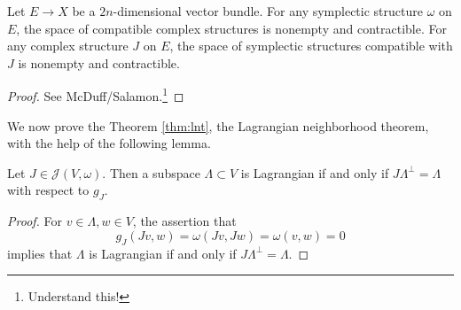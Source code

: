 \documentclass{amsart}
\begin{document}
\begin{theorem}
    Let $E\to X$ be a $2n$-dimensional vector bundle. For any symplectic structure
    $\omega$ on $E$, the space of compatible complex structures is nonempty and
    contractible. For any complex structure $J$ on $E$, the space of symplectic
    structures compatible with $J$ is nonempty and contractible.
    \label{thm:herm}
\end{theorem}
\begin{proof}
    See McDuff/Salamon.\footnote{Understand this!}
\end{proof}

We now prove the Theorem \ref{thm:lnt}, the Lagrangian neighborhood theorem, with the help
of the following lemma.

\begin{lemma}
    Let $J\in\mathcal{J}(V,\omega)$. Then a subspace $\Lambda\subset V$ is Lagrangian
    if and only if $J\Lambda^\perp=\Lambda$ with respect to $g_J$.
\end{lemma}
\begin{proof}
    For $v\in\Lambda,w\in V$, the assertion that
    \begin{equation*}
        g_J(Jv,w)=\omega(Jv,Jw)=\omega(v,w)=0
    \end{equation*}
    implies that $\Lambda$ is Lagrangian if and only if $J\Lambda^\perp=\Lambda$.
\end{proof}
\end{document}
